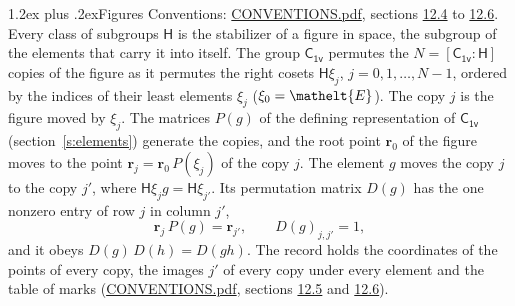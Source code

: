 \documentclass[10pt,a4paper]{article}
\makeatletter
\renewcommand\section{\@startsection{section}{1}{\z@}{-3ex plus -1ex minus -.2ex}%
  {1.2ex plus .2ex}{\normalfont\large\sffamily\bfseries\color{parttitle}}}
\numberwithin{equation}{section}
\newcommand{\eltfont}[1]{{\let\sigma\eltsigma\mathelt{#1}}}
\newcommand{\grp}[1]{\mathsf{#1}}
\newcommand{\cls}[1]{\eltfont{#1}}
\newcommand{\pointr}{\mathbf{r}}
\makeatother
\begin{document}
\section{Figures}\label{s:permutation}
Conventions: \href{../../CONVENTIONS.pdf}{CONVENTIONS.pdf}, sections \href{../../CONVENTIONS.pdf\#conv.12.4}{12.4} to \href{../../CONVENTIONS.pdf\#conv.12.6}{12.6}.
Every class of subgroups $\grp{H}$ is the stabilizer of a figure in space, the subgroup of the elements that carry it into itself. \label{n:local.orbit.size}\label{n:element.coset.least}\label{n:index.coset}The group $\grp{C_{1v}}$ permutes the $N = [\grp{C_{1v}} : \grp{H}]$ copies of the figure as it permutes the right cosets $\grp{H}\xi_j$, $j = 0, 1, \dots, N - 1$, ordered by the indices of their least elements $\xi_j$ ($\xi_0 = \cls{E}$). The copy $j$ is the figure moved by $\xi_j$. The matrices $P(g)$ of the defining representation of $\grp{C_{1v}}$ (section~\ref{s:elements}) generate the copies, and the root point $\pointr_0$ of the figure moves to the point $\pointr_j = \pointr_0\, P(\xi_j)$ of the copy $j$. \label{n:local.coset.image}The element $g$ moves the copy $j$ to the copy $j'$, where $\grp{H}\xi_j g = \grp{H}\xi_{j'}$. \label{n:local.matrix.permutation}Its permutation matrix $D(g)$ has the one nonzero entry of row $j$ in column $j'$,
\begin{equation}\label{e:perm.matrix}\pointr_j\, P(g) = \pointr_{j'}, \qquad D(g)_{j,j'} = 1,\end{equation}
and it obeys $D(g)\, D(h) = D(gh)$. The record holds the coordinates of the points of every copy, the images $j'$ of every copy under every element and the table of marks (\href{../../CONVENTIONS.pdf}{CONVENTIONS.pdf}, sections \href{../../CONVENTIONS.pdf\#conv.12.5}{12.5} and \href{../../CONVENTIONS.pdf\#conv.12.6}{12.6}).
\end{document}
